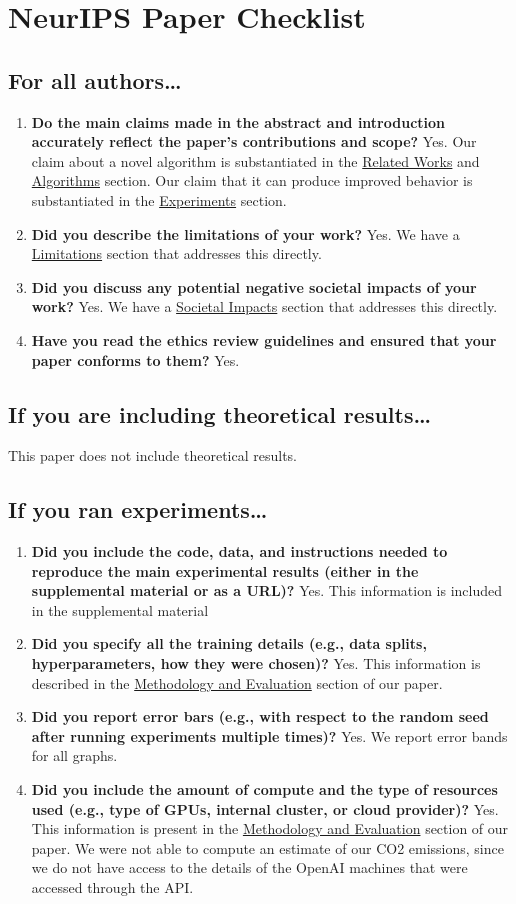 \documentclass{article}
\begin{document}
\newpage
\section{NeurIPS Paper Checklist}
\subsection{For all authors\dots}
\begin{enumerate}
  \item \textbf{Do the main claims made in the abstract and introduction accurately reflect the paper's contributions and scope?}
        Yes. Our claim about a novel algorithm is substantiated in the \hyperref[sec:related]{Related Works} and \hyperref[sec:algorithms]{Algorithms} section. Our claim that it can produce improved behavior is substantiated in the \hyperref[sec:experiments]{Experiments} section.
  \item \textbf{Did you describe the limitations of your work?}
        Yes. We have a \hyperref[para:limitations]{Limitations} section that addresses this directly.
  \item \textbf{Did you discuss any potential negative societal impacts of your work?}
        Yes. We have a \hyperref[para:impacts]{Societal Impacts} section that addresses this directly.
  \item \textbf{Have you read the ethics review guidelines and ensured that your paper conforms to them?} Yes.
\end{enumerate}
\subsection{If you are including theoretical results\dots}
This paper does not include theoretical results.
\subsection{If you ran experiments\dots}
\begin{enumerate}
  \item \textbf{Did you include the code, data, and instructions needed to reproduce the main experimental results (either in the supplemental material or as a URL)?}
        Yes. This information is included in the supplemental material
  \item \textbf{Did you specify all the training details (e.g., data splits, hyperparameters, how they were chosen)?}
        Yes. This information is described in the \hyperref[para:methodology]{Methodology and Evaluation} section of our paper.
  \item \textbf{Did you report error bars (e.g., with respect to the random seed after running experiments multiple times)?}
        Yes. We report error bands for all graphs.
  \item \textbf{Did you include the amount of compute and the type of resources used (e.g., type of GPUs, internal cluster, or cloud provider)?}
        Yes. This information is present in the \hyperref[para:methodology]{Methodology and Evaluation} section of our paper. We were not able to compute an estimate of our CO2 emissions, since we do not have access to the details of the OpenAI machines that were accessed through the API.
\end{enumerate}
\end{document}
